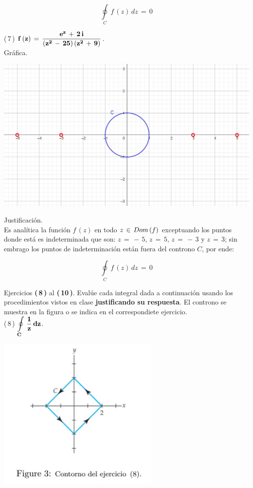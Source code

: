 \documentclass[a4paper,11pt,openany]{book}
\begin{document}
$$\oint\limits_{C}\,f\,(z)\,dz\,=\,0$$

\textcolor{ao(english)}{(\,7\,)} $\bf{f\,(z)\,=\,\dfrac{e^{z}\,+\,2\,i}{(z^{2}\,-\,25)\,(z^{2}\,+\,9)}}$.\\

\textcolor{ao(english)}{} Gráfica.

\begin{center}
     \includegraphics[width=15cm]{Gra-Ej-7.png}
\end{center}

\textcolor{ao(english)}{} Justificación.\\

Es analítica la función $f\,(z)$ en todo $z\,\in\,\mathnormal{Dom\,(f)}$ exceptuando los puntos donde está es indeterminada que son: $z\,=\,-\,5$, $z\,=\,5$, $z\,=\,-\,3$ y $z\,=\,3$; sin embrago los puntos de indeterminación están fuera del controno $C$, por ende:

$$\oint\limits_{C}\,f\,(z)\,dz\,=\,0$$

Ejercicios \textbf{(\,8\,)} al \textbf{(\,10\,)}. Evalúe cada integral dada a continuación usando los procedimientos vistos en clase \textbf{justificando su respuesta}. El controno se muestra en la figura o se indica en el correspondiete ejercicio.\\

\textcolor{ao(english)}{(\,8\,)} $\bf{\displaystyle\oint\limits_{C}\,\dfrac{1}{z}\,dz}$.

\begin{center}
     \includegraphics[width=8cm]{figura-3.JPG}
\end{center}
\end{document}
